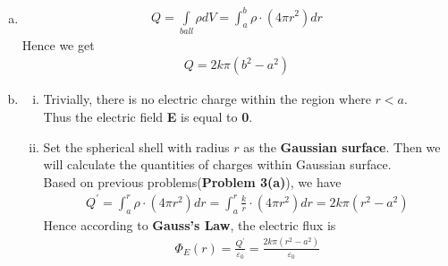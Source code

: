 \documentclass[12pt,a4paper]{article}
\begin{document}
\begin{enumerate}[(a)]
    \item
    \begin{align}
        Q = \int\limits_{ball} \rho dV = \int_a^b \rho \cdot (4\pi r^2) dr
    \end{align}
    Hence we get
    \begin{align}
        Q = 2k\pi(b^2 - a^2)
    \end{align}
    
    \item
        \begin{enumerate}[(i)]
            \item Trivially, there is no electric charge within the region where $r < a$. \\
            Thus the electric field \textbf{E} is equal to \textbf{0}.
            \item Set the spherical shell with radius $r$ as the \textbf{Gaussian surface}. Then we will calculate the quantities of charges within Gaussian surface.\\
            Based on previous problems(\textbf{Problem 3(a)}), we have
            \begin{align}
                Q^{\prime} = \int_a^r \rho \cdot (4\pi r^2) dr = \int_a^r \frac{k}{r} \cdot (4\pi r^2) dr = 2k\pi (r^2-a^2)
            \end{align}
            Hence according to \textbf{Gauss's Law}, the electric flux is
            \begin{align}
                \Phi_E(r) = \frac{Q^{\prime}}{\varepsilon_0} = \frac{2k\pi (r^2-a^2)}{\varepsilon_0}
                \label{3-Gauss's Law}
            \end{align}
            

\end{enumerate}
\end{enumerate}
\end{document}
